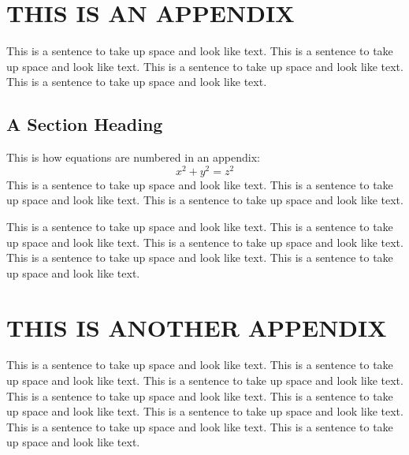  
\appendix    %

\chapter{THIS IS AN APPENDIX}
This is a sentence to take up space and look like text.
This is a sentence to take up space and look like text.
This is a sentence to take up space and look like text.
This is a sentence to take up space and look like text.
\section{A Section Heading}
This is how equations are numbered in an appendix:
\begin{equation}
x^2 + y^2 = z^2
\end{equation} 
This is a sentence to take up space and look like text.
This is a sentence to take up space and look like text.
This is a sentence to take up space and look like text.
 
This is a sentence to take up space and look like text.
This is a sentence to take up space and look like text.
This is a sentence to take up space and look like text.
This is a sentence to take up space and look like text.
This is a sentence to take up space and look like text. 

\chapter{THIS IS ANOTHER APPENDIX} 
This is a sentence to take up space and look like text.
This is a sentence to take up space and look like text.
This is a sentence to take up space and look like text.
This is a sentence to take up space and look like text.
This is a sentence to take up space and look like text.
This is a sentence to take up space and look like text.
This is a sentence to take up space and look like text.
This is a sentence to take up space and look like text.
 
